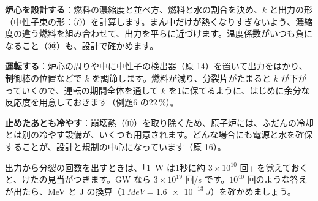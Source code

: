 \begin{phkougaku}
\textbf{炉心を設計する}：燃料の濃縮度と並べ方、燃料と水の割合を決め、$k$ と出力の形（中性子束の形：⑦）を計算します。まん中だけが熱くなりすぎないよう、濃縮度の違う燃料を組み合わせて、出力を平らに近づけます。温度係数がいつも負になること（⑩）も、設計で確かめます。

\textbf{運転する}：炉心の周りや中に中性子の検出器（原-14）を置いて出力をはかり、制御棒の位置などで $k$ を調節します。燃料が減り、分裂片がたまると $k$ が下がっていくので、運転の期間全体を通して $k$ を1に保てるように、はじめに余分な反応度を用意しておきます（例題6 の22\,\%）。

\textbf{止めたあとも冷やす}：崩壊熱（⑪）を取り除くため、原子炉には、ふだんの冷却とは別の冷やす設備が、いくつも用意されます。どんな場合にも電源と水を確保することが、設計と規制の中心になっています（原-16）。

\begin{phketa}[原子炉の数の目安]
出力から分裂の回数を出すときは、「\qty{1}{W} は1秒に約 $3\times10^{10}$ 回」を覚えておくと、けたの見当がつきます。GW なら $3\times10^{19}$ 回/s です。$10^{40}$ 回のような答えが出たら、MeV と J の換算（$\qty{1}{MeV}=\qty{1.6e-13}{J}$）を確かめましょう。
\end{phketa}
\end{phkougaku}

